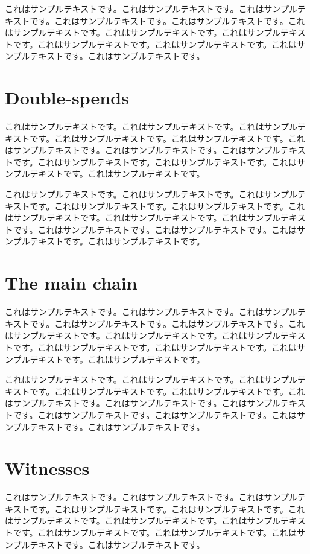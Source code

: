 \documentclass[a4paper, dvipdfmx]{jsarticle}
\begin{document}
これはサンプルテキストです。これはサンプルテキストです。これはサンプルテキストです。これはサンプルテキストです。これはサンプルテキストです。これはサンプルテキストです。これはサンプルテキストです。これはサンプルテキストです。これはサンプルテキストです。これはサンプルテキストです。これはサンプルテキストです。これはサンプルテキストです。

\section{Double-spends}
これはサンプルテキストです。これはサンプルテキストです。これはサンプルテキストです。これはサンプルテキストです。これはサンプルテキストです。これはサンプルテキストです。これはサンプルテキストです。これはサンプルテキストです。これはサンプルテキストです。これはサンプルテキストです。これはサンプルテキストです。これはサンプルテキストです。

これはサンプルテキストです。これはサンプルテキストです。これはサンプルテキストです。これはサンプルテキストです。これはサンプルテキストです。これはサンプルテキストです。これはサンプルテキストです。これはサンプルテキストです。これはサンプルテキストです。これはサンプルテキストです。これはサンプルテキストです。これはサンプルテキストです。

\section{The main chain}
これはサンプルテキストです。これはサンプルテキストです。これはサンプルテキストです。これはサンプルテキストです。これはサンプルテキストです。これはサンプルテキストです。これはサンプルテキストです。これはサンプルテキストです。これはサンプルテキストです。これはサンプルテキストです。これはサンプルテキストです。これはサンプルテキストです。

これはサンプルテキストです。これはサンプルテキストです。これはサンプルテキストです。これはサンプルテキストです。これはサンプルテキストです。これはサンプルテキストです。これはサンプルテキストです。これはサンプルテキストです。これはサンプルテキストです。これはサンプルテキストです。これはサンプルテキストです。これはサンプルテキストです。

\section{Witnesses}
これはサンプルテキストです。これはサンプルテキストです。これはサンプルテキストです。これはサンプルテキストです。これはサンプルテキストです。これはサンプルテキストです。これはサンプルテキストです。これはサンプルテキストです。これはサンプルテキストです。これはサンプルテキストです。これはサンプルテキストです。これはサンプルテキストです。
\end{document}
